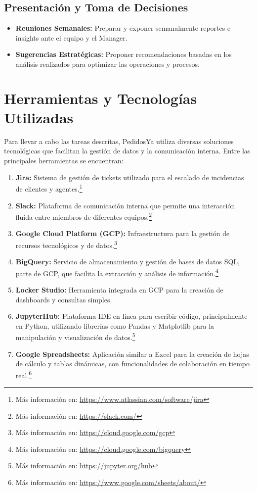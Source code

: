 \subsection{Presentación y Toma de Decisiones}
\begin{itemize}
  \item \textbf{Reuniones Semanales:} Preparar y exponer semanalmente reportes e insights ante el equipo y el Manager.
  \item \textbf{Sugerencias Estratégicas:} Proponer recomendaciones basadas en los análisis realizados para optimizar las operaciones y procesos.
\end{itemize}

\section{Herramientas y Tecnologías Utilizadas \label{sec:sec3}}
Para llevar a cabo las tareas descritas, PedidosYa utiliza diversas soluciones tecnológicas que facilitan la gestión de datos y la comunicación interna. Entre las principales herramientas se encuentran:

\begin{enumerate}
  \item \textbf{Jira:} Sistema de gestión de tickets utilizado para el escalado de incidencias de clientes y agentes.\footnote{Más información en: \url{https://www.atlassian.com/software/jira}}
  \item \textbf{Slack:} Plataforma de comunicación interna que permite una interacción fluida entre miembros de diferentes equipos.\footnote{Más información en: \url{https://slack.com/}}
  \item \textbf{Google Cloud Platform (GCP):} Infraestructura para la gestión de recursos tecnológicos y de datos.\footnote{Más información en: \url{https://cloud.google.com/gcp}}
  \item \textbf{BigQuery:} Servicio de almacenamiento y gestión de bases de datos SQL, parte de GCP, que facilita la extracción y análisis de información.\footnote{Más información en: \url{https://cloud.google.com/bigquery}}
  \item \textbf{Locker Studio:} Herramienta integrada en GCP para la creación de dashboards y consultas simples.
  \item \textbf{JupyterHub:} Plataforma IDE en línea para escribir código, principalmente en Python, utilizando librerías como Pandas y Matplotlib para la manipulación y visualización de datos.\footnote{Más información en: \url{https://jupyter.org/hub}}
  \item \textbf{Google Spreadsheets:} Aplicación similar a Excel para la creación de hojas de cálculo y tablas dinámicas, con funcionalidades de colaboración en tiempo real.\footnote{Más información en: \url{https://www.google.com/sheets/about/}}
\end{enumerate}


